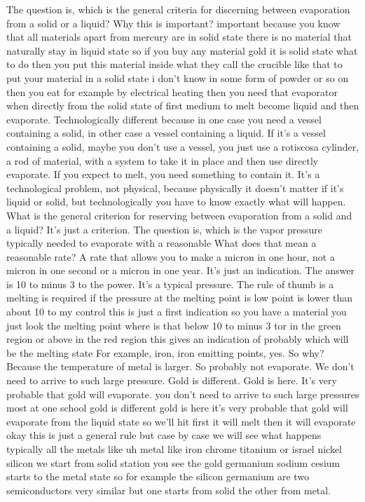 The question is, which is the general criteria for discerning between evaporation from a solid or a liquid? Why this is important? important because you know that all materials apart from mercury are in solid state there is no material that naturally stay in liquid state so if you buy any material gold it is solid state what to do then you put this material inside what they call the crucible like that to put your material in a solid state i don't know in some form of powder or so on then you eat for example by electrical heating then you need that evaporator when directly from the solid state of first medium to melt become liquid and then evaporate. Technologically different because in one case you need a vessel containing a solid, in other case a vessel containing a liquid. If it's a vessel containing a solid, maybe you don't use a vessel, you just use a rotiscosa cylinder, a rod of material, with a system to take it in place and then use directly evaporate. If you expect to melt, you need something to contain it. It's a technological problem, not physical, because physically it doesn't matter if it's liquid or solid, but technologically you have to know exactly what will happen. What is the general criterion for reserving between evaporation from a solid and a liquid? It's just a criterion. The question is, which is the vapor pressure typically needed to evaporate with a reasonable What does that mean a reasonable rate? A rate that allows you to make a micron in one hour, not a micron in one second or a micron in one year. It's just an indication. The answer is 10 to minus 3 to the power. It's a typical pressure. The rule of thumb is a melting is required if the pressure at the melting point is low point is lower than about 10 to my control this is just a first indication so you have a material you just look the melting point where is that below 10 to minus 3 tor in the green region or above in the red region this gives an indication of probably which will be the melting state For example, iron, iron emitting points, yes. So why? Because the temperature of metal is larger. So probably not evaporate. We don't need to arrive to such large pressure. Gold is different. Gold is here. It's very probable that gold will evaporate. you don't need to arrive to such large pressures most at one school gold is different gold is here it's very probable that gold will evaporate from the liquid state so we'll hit first it will melt then it will evaporate okay this is just a general rule but case by case we will see what happens typically all the metals like uh metal like iron chrome titanium or israel nickel silicon we start from solid station you see the gold germanium sodium cesium starts to the metal state so for example the silicon germanium are two semiconductors very similar but one starts from solid the other from metal.
